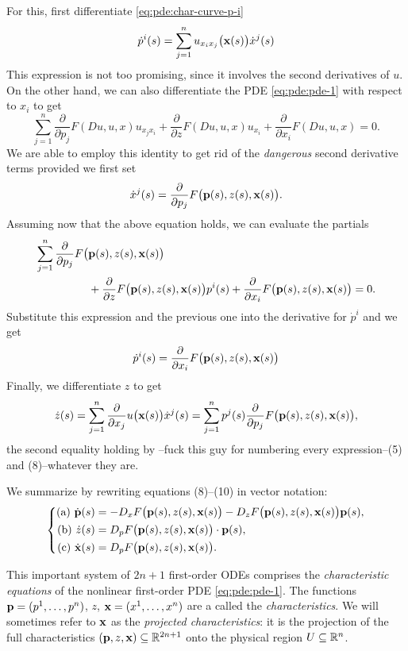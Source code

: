 For this, first differentiate \eqref{eq:pde:char-curve-p-i}
\[
  \dot{p}^i(s)=\sum_{j=1}^n u_{x_ix_j}\bigl(\mathbf{x}(s)\bigr)\dot{x}^j(s)
\]
This expression is not too promising, since it involves the second
derivatives of \(u\). On the other hand, we can also differentiate the PDE
\eqref{eq:pde:pde-1} with respect to \(x_i\) to get
\[
  \sum_{j=1}^n
  \frac{\partial}{\partial p_j}F(Du,u,x)u_{x_jx_i}
  +\frac{\partial}{\partial z}F(Du,u,x)u_{x_i}
  +\frac{\partial}{\partial x_i}F(Du,u,x)=0.
\]
We are able to employ this identity to get rid of the \emph{dangerous}
second derivative terms provided we first set
\[
  \dot{x}^j(s)=\frac{\partial}{\partial
    p_j}F\bigl(\mathbf{p}(s),z(s),\mathbf{x}(s)\bigr).
\]
Assuming now that the above equation holds, we can evaluate the partials
\[
  \begin{aligned}
    \sum_{j=1}^n\frac{\partial}{\partial
      p_j}F\bigl(&\mathbf{p}(s),z(s),\mathbf{x}(s)\bigr)\\
    &+\frac{\partial}{\partial z}F\bigl(\mathbf{p}(s),z(s),\mathbf{x}(s)\bigr)p^{i}(s)
    +\frac{\partial}{\partial x_i}F\bigl(\mathbf{p}(s),z(s),\mathbf{x}(s)\bigr)=0.
  \end{aligned}
\]
Substitute this expression and the previous one into the derivative for
\(\dot{p}^i\) and we get
\[
  \begin{aligned}
    \dot{p}^i(s)=\frac{\partial}{\partial x_i}F\bigl(\mathbf{p}(s),z(s),\mathbf{x}(s)\bigr)
  \end{aligned}
\]
Finally, we differentiate \(z\) to get
\[
  \dot z(s)=
  \sum_{j=1}^n\frac{\partial}{\partial x_j}u\bigl(\mathbf{x}(s)\bigr)
  \dot{x}^j(s)=
  \sum_{j=1}^n p^j(s)\frac{\partial}{\partial
    p_j}F\bigl(\mathbf{p}(s),z(s),\mathbf{x}(s)\bigr),
\]
the second equality holding by --fuck this guy for numbering every
expression--(5) and (8)--whatever they are.

We summarize by rewriting equations (8)--(10) in vector notation:
\begin{equation}
  \label{eq:pde:characteristics}
  \left\{
    \begin{aligned}
      \text{(a) }\dot{\mathbf{p}}(s)&=-D_xF\bigl(\mathbf{p}(s),z(s),\mathbf{x}(s)\bigr)
      -D_zF\bigl(\mathbf{p}(s),z(s),\mathbf{x}(s)\bigr)\mathbf{p}(s),\\
      \text{(b) }\dot z(s)&=D_pF\bigl(\mathbf{p}(s),z(s),\mathbf{x}(s)\bigr)\cdot\mathbf{p}(s),\\
      \text{(c) }\dot{\mathbf{x}}(s)&=D_pF\bigl(\mathbf{p}(s),z(s),\mathbf{x}(s)\bigr).
    \end{aligned}
  \right.
\end{equation}

This important system of \(2n+1\) first-order ODEs comprises the
\emph{characteristic equations} of the nonlinear first-order PDE
\eqref{eq:pde:pde-1}. The functions \(\mathbf{p}=(p^1,\dotsc,p^n)\), \(z\),
\(\mathbf{x}=(x^1,\dotsc,x^n)\) are a called the \emph{characteristics}. We will
sometimes refer to \(\mathbf{x}\) as the \emph{projected characteristics}: it is
the projection of the full characteristics
\((\mathbf{p},z,\mathbf{x})\subseteq\mathbb{R}^{2n+1}\) onto the physical region
\(U\subseteq\mathbb{R}^n\).

